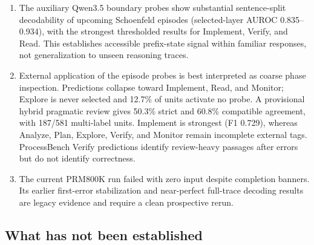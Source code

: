 \documentclass[manuscript,screen,review]{jair}
\begin{document}
\begin{enumerate}
$[-0.614,-0.500]$) and larger mean router margin ($r=0.301$,
$[0.231,0.376]$).  Correct traces are also substantially shorter
($r=-0.520$), while backtracking and self-correction are most strongly
associated with greater length.  These are marginal trace-level associations;
the current single-attempt design cannot isolate routing from length or
problem difficulty.
\item The auxiliary Qwen3.5 boundary probes show substantial sentence-split
decodability of upcoming Schoenfeld episodes (selected-layer AUROC
0.835--0.934), with the strongest thresholded results for Implement, Verify,
and Read.  This establishes accessible prefix-state signal within familiar
responses, not generalization to unseen reasoning traces.
\item External application of the episode probes is best interpreted as
coarse phase inspection.  Predictions collapse toward Implement, Read, and
Monitor; Explore is never selected and 12.7\% of units activate no probe.  A
provisional hybrid pragmatic review gives 50.3\% strict and 60.8\% compatible
agreement, with 187/581 multi-label units.  Implement is strongest (F1 0.729),
whereas Analyze, Plan, Explore, Verify, and Monitor remain incomplete external
tags.  ProcessBench Verify predictions identify review-heavy passages after
errors but do not identify correctness.
\item The current PRM800K run failed with zero input despite completion
banners.  Its earlier first-error stabilization and near-perfect full-trace
decoding results are legacy evidence and require a clean prospective rerun.
\end{enumerate}

\subsection{What has not been established}
\end{document}
